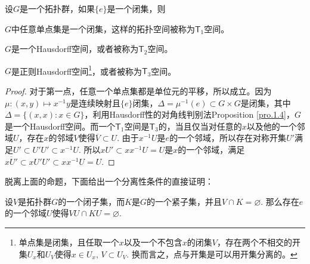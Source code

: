 

\begin{pro}\label{pro:3}
设$G$是一个拓扑群，如果$\{e\}$是一个闭集，则

\begin{compactenum}
\item $G$中任意单点集是一个闭集，这样的拓扑空间被称为$\mathsf{T}_1$空间。

\item $G$是一个Hausdorff空间，或者被称为$\mathsf{T}_2$空间。

\item $G$是正则Hausdorff空间\footnote{单点集是闭集，且任取一个$x$以及一个不包含$x$的闭集$V$，存在两个不相交的开集$U_x$和$U_V$使得$x\in U_x$, $V\subset U_V$. 换而言之，点与开集是可以用开集分离的。}，或者被称为$\mathsf{T}_3$空间。
\end{compactenum}
\end{pro}

\begin{proof}
	对于第一点，任意一个单点集都是单位元的平移，所以成立。因为$\mu:(x,y)\mapsto x^{-1}y$是连续映射且$\{e\}$闭集，$\Delta=\mu^{-1}(e)\subset G\times G$是闭集，其中$\Delta=\{(x,x):x\in G\}$，利用Hausdorff性的对角线判别法Proposition \ref{pro.1.4}，$G$是一个Hausdorff空间。而一个$\mathsf{T}_1$空间是$\mathsf{T}_3$的，当且仅当对任意的$x$以及他的一个邻域$U$，存在$x$的邻域$V$使得$\overline{V}\subset U$. 由于$x^{-1}U$是$e$的一个邻域，所以存在对称开集$U'$满足$U'\subset U'U'\subset x^{-1}U$. 所以$xU'\subset xx^{-1}U=U$是$x$的一个邻域，满足$\overline{xU'}\subset xU'U'\subset xx^{-1}U=U$.
\end{proof}

脱离上面的命题，下面给出一个分离性条件的直接证明：

\begin{pro}
设$V$是拓扑群$G$的一个闭子集，而$K$是$G$的一个紧子集，并且$V\cap K=\varnothing$. 那么存在$e$的一个邻域$U$使得$VU\cap KU=\varnothing$.
\end{pro}

